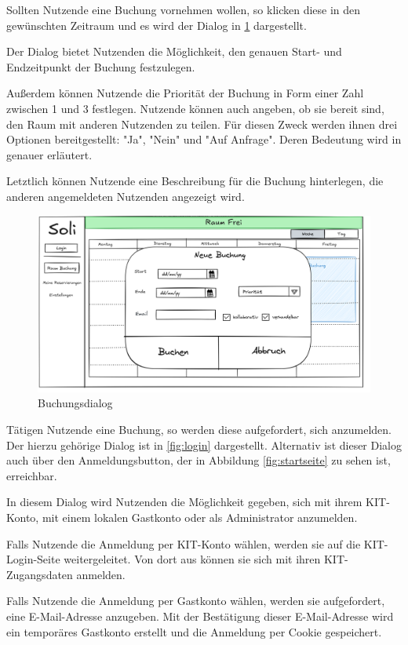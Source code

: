Sollten Nutzende eine Buchung vornehmen wollen, so klicken diese in den gewünschten Zeitraum
und es wird der Dialog in \ref{fig:buchung} dargestellt.

Der Dialog bietet Nutzenden die Möglichkeit, den genauen Start- und Endzeitpunkt der Buchung festzulegen.

Außerdem können Nutzende die Priorität der Buchung in Form einer Zahl zwischen 1 und 3 festlegen.
Nutzende können auch angeben, ob sie bereit sind, den Raum mit anderen Nutzenden zu teilen.
Für diesen Zweck werden ihnen drei Optionen bereitgestellt: "Ja", "Nein" und "Auf Anfrage".
Deren Bedeutung wird in  genauer erläutert.

Letztlich können Nutzende eine Beschreibung für die Buchung hinterlegen, die anderen angemeldeten Nutzenden angezeigt wird.
\begin{figure}[ht]
    \centering
    \includegraphics[scale=0.15]{figures/ui/buchungsdialog}
    \caption{Buchungsdialog}
    \label{fig:buchung}
\end{figure}
\clearpage

Tätigen Nutzende eine Buchung, so werden diese aufgefordert, sich anzumelden.
Der hierzu gehörige Dialog ist in \ref{fig:login} dargestellt.
Alternativ ist dieser Dialog auch über den Anmeldungsbutton, der in Abbildung \ref{fig:startseite} zu sehen ist, erreichbar.

In diesem Dialog wird Nutzenden die Möglichkeit gegeben, sich mit ihrem KIT-Konto, mit einem lokalen Gastkonto oder als Administrator anzumelden.

Falls Nutzende die Anmeldung per KIT-Konto wählen, werden sie auf die KIT-Login-Seite weitergeleitet.
Von dort aus können sie sich mit ihren KIT-Zugangsdaten anmelden.

Falls Nutzende die Anmeldung per Gastkonto wählen, werden sie aufgefordert, eine E-Mail-Adresse anzugeben.
Mit der Bestätigung dieser E-Mail-Adresse wird ein temporäres Gastkonto erstellt und die Anmeldung per Cookie gespeichert.

